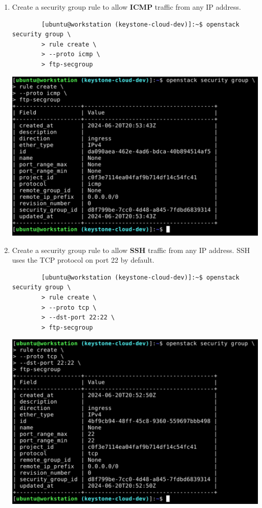 \documentclass[letterpaper, 12pt]{article}
\begin{document}
\begin{enumerate}
    \item Create a security group rule to allow \textbf{ICMP} traffic from any IP address.
    \begin{lstlisting}
        [ubuntu@workstation (keystone-cloud-dev)]:~$ openstack security group \
        > rule create \
        > --proto icmp \
        > ftp-secgroup
    \end{lstlisting}

    \begin{center}
        \includegraphics[width=\linewidth]{images/part1/step33.png}
    \end{center}

    \item Create a security group rule to allow \textbf{SSH} traffic from any IP address.
    SSH uses the TCP protocol on port 22 by default.
    \begin{lstlisting}
        [ubuntu@workstation (keystone-cloud-dev)]:~$ openstack security group \
        > rule create \
        > --proto tcp \
        > --dst-port 22:22 \
        > ftp-secgroup
    \end{lstlisting}

    \begin{center}
        \includegraphics[width=\linewidth]{images/part1/step34.png}
    \end{center}


\end{enumerate}
\end{document}
